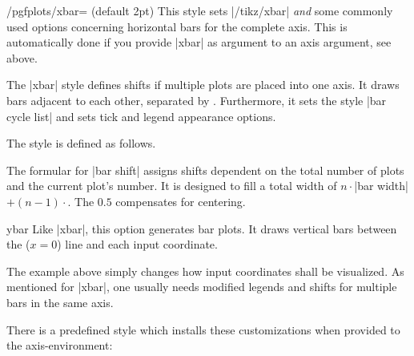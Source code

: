 {\begin{stylekey}{/pgfplots/xbar= (default 2pt)}
	This style sets |/tikz/xbar| \emph{and} some commonly used options concerning horizontal bars for the complete axis. This is automatically done if you provide |xbar| as argument to an axis argument, see above.

The |xbar| style defines shifts if multiple plots are placed into one axis. It draws bars adjacent to each other, separated by . Furthermore, it sets the style |bar cycle list| and sets tick and legend appearance options.

The style is defined as follows.
\begin{codeexample}
\end{codeexample}
The formular for |bar shift| assigns shifts dependent on the total number of plots and the current plot's number. It is designed to fill a total width of $n \cdot $|bar width|$ + (n-1) \cdot $. The $0.5$ compensates for centering.
\end{stylekey}

\begin{plottype}{ybar}
	Like |xbar|, this option generates bar plots. It draws vertical bars between the ($x=0$) line and each input coordinate.
\begin{codeexample}[]
\end{codeexample}
	The example above simply changes how input coordinates shall be visualized. As mentioned for |xbar|, one usually needs modified legends and shifts for multiple bars in the same axis.

	There is a predefined style which installs these customizations when provided to the axis-environment:
\begin{codeexample}[]
\end{codeexample}
\end{plottype}}
